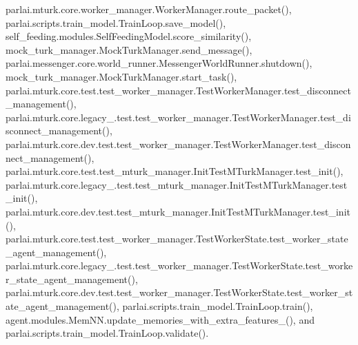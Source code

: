parlai.\+mturk.\+core.\+worker\+\_\+manager.\+Worker\+Manager.\+route\+\_\+packet(), parlai.\+scripts.\+train\+\_\+model.\+Train\+Loop.\+save\+\_\+model(), self\+\_\+feeding.\+modules.\+Self\+Feeding\+Model.\+score\+\_\+similarity(), mock\+\_\+turk\+\_\+manager.\+Mock\+Turk\+Manager.\+send\+\_\+message(), parlai.\+messenger.\+core.\+world\+\_\+runner.\+Messenger\+World\+Runner.\+shutdown(), mock\+\_\+turk\+\_\+manager.\+Mock\+Turk\+Manager.\+start\+\_\+task(), parlai.\+mturk.\+core.\+test.\+test\+\_\+worker\+\_\+manager.\+Test\+Worker\+Manager.\+test\+\_\+disconnect\+\_\+management(), parlai.\+mturk.\+core.\+legacy\+\_.\+test.\+test\+\_\+worker\+\_\+manager.\+Test\+Worker\+Manager.\+test\+\_\+disconnect\+\_\+management(), parlai.\+mturk.\+core.\+dev.\+test.\+test\+\_\+worker\+\_\+manager.\+Test\+Worker\+Manager.\+test\+\_\+disconnect\+\_\+management(), parlai.\+mturk.\+core.\+test.\+test\+\_\+mturk\+\_\+manager.\+Init\+Test\+M\+Turk\+Manager.\+test\+\_\+init(), parlai.\+mturk.\+core.\+legacy\+\_.\+test.\+test\+\_\+mturk\+\_\+manager.\+Init\+Test\+M\+Turk\+Manager.\+test\+\_\+init(), parlai.\+mturk.\+core.\+dev.\+test.\+test\+\_\+mturk\+\_\+manager.\+Init\+Test\+M\+Turk\+Manager.\+test\+\_\+init(), parlai.\+mturk.\+core.\+test.\+test\+\_\+worker\+\_\+manager.\+Test\+Worker\+State.\+test\+\_\+worker\+\_\+state\+\_\+agent\+\_\+management(), parlai.\+mturk.\+core.\+legacy\+\_.\+test.\+test\+\_\+worker\+\_\+manager.\+Test\+Worker\+State.\+test\+\_\+worker\+\_\+state\+\_\+agent\+\_\+management(), parlai.\+mturk.\+core.\+dev.\+test.\+test\+\_\+worker\+\_\+manager.\+Test\+Worker\+State.\+test\+\_\+worker\+\_\+state\+\_\+agent\+\_\+management(), parlai.\+scripts.\+train\+\_\+model.\+Train\+Loop.\+train(), agent.\+modules.\+Mem\+N\+N.\+update\+\_\+memories\+\_\+with\+\_\+extra\+\_\+features\+\_\+(), and parlai.\+scripts.\+train\+\_\+model.\+Train\+Loop.\+validate().

\mbox{\label{classparlai_1_1messenger_1_1core_1_1world__runner_1_1MessengerWorldRunner_a3bd04ed0186a27e1a6233ba827ce1196}} 
